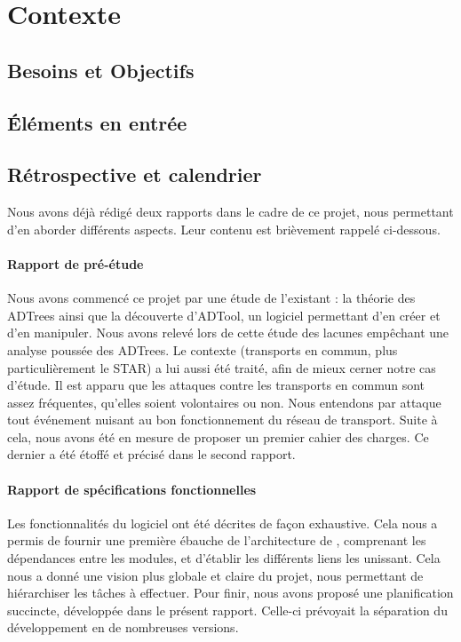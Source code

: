 \section{Contexte}

	\subsection{Besoins et Objectifs}
	
	\subsection{Éléments en entrée}
	
	\subsection{Rétrospective et calendrier}
	Nous avons déjà rédigé deux rapports dans le cadre de ce projet, nous permettant d'en aborder différents aspects. Leur contenu est brièvement rappelé ci-dessous.

	\paragraph{Rapport de pré-étude} Nous avons commencé ce projet par une étude de l'existant : la théorie des ADTrees ainsi que la découverte d'ADTool, un logiciel permettant d'en créer et d'en manipuler. Nous avons relevé lors de cette étude des lacunes empêchant une analyse poussée des ADTrees. Le contexte (transports en commun, plus particulièrement le STAR) a lui aussi été traité, afin de mieux cerner notre cas d'étude. Il est apparu que les attaques contre les transports en commun sont assez fréquentes, qu'elles soient volontaires ou non. Nous entendons par \og attaque \fg{} tout événement nuisant au bon fonctionnement du réseau de transport. Suite à cela, nous avons été en mesure de proposer un premier cahier des charges. Ce dernier a été étoffé et précisé dans le second rapport.

	\paragraph{Rapport de spécifications fonctionnelles} Les fonctionnalités du logiciel ont été décrites de façon exhaustive. Cela nous a permis de fournir une première ébauche de l'architecture de \glasir{}, comprenant les dépendances entre les modules, et d'établir les différents liens les unissant. Cela nous a donné une vision plus globale et claire du projet, nous permettant de hiérarchiser les tâches à effectuer. Pour finir, nous avons proposé une planification succincte, développée dans le présent rapport. Celle-ci prévoyait la séparation du développement en de nombreuses versions.